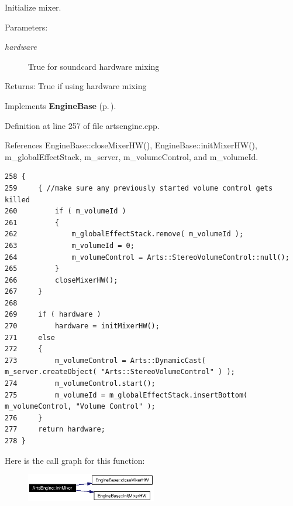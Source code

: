 Initialize mixer. \begin{Desc}
\item[Parameters:]
\begin{description}
\item[{\em hardware}]True for soundcard hardware mixing \end{description}
\end{Desc}
\begin{Desc}
\item[Returns:]True if using hardware mixing \end{Desc}


Implements {\bf Engine\-Base} {\rm (p.\,\pageref{classEngineBase_EngineBasea3})}.

Definition at line 257 of file artsengine.cpp.

References Engine\-Base::close\-Mixer\-HW(), Engine\-Base::init\-Mixer\-HW(), m\_\-global\-Effect\-Stack, m\_\-server, m\_\-volume\-Control, and m\_\-volume\-Id.



\footnotesize\begin{verbatim}258 {
259     { //make sure any previously started volume control gets killed
260         if ( m_volumeId )
261         {
262             m_globalEffectStack.remove( m_volumeId );
263             m_volumeId = 0;
264             m_volumeControl = Arts::StereoVolumeControl::null();
265         }
266         closeMixerHW();
267     }
268 
269     if ( hardware )
270         hardware = initMixerHW();
271     else
272     {
273         m_volumeControl = Arts::DynamicCast( m_server.createObject( "Arts::StereoVolumeControl" ) );
274         m_volumeControl.start();
275         m_volumeId = m_globalEffectStack.insertBottom( m_volumeControl, "Volume Control" );
276     }
277     return hardware;
278 }
\end{verbatim}\normalsize 


Here is the call graph for this function:\begin{figure}[H]
\begin{center}
\leavevmode
\includegraphics[width=161pt]{classArtsEngine_ArtsEnginea3_cgraph}
\end{center}
\end{figure}
